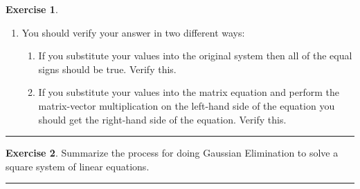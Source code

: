 \documentclass[
]{book}
\providecommand{\tightlist}{%
  \setlength{\itemsep}{0pt}\setlength{\parskip}{0pt}}
\theoremstyle{definition}
\theoremstyle{definition}
\theoremstyle{definition}
\newtheorem{exercise}{Exercise}[chapter]
\theoremstyle{remark}
\begin{document}
\begin{exercise}
\begin{enumerate}
  \begin{enumerate}
  \def\labelenumii{\roman{enumii}.}
  \tightlist
  \item
    Make the value in row 2 column 2 a 1 by scaling row 2. What did you scale by? Why?
  \item
    Scale row 2 by something and add it to row 1 so that the entry in row 1 column 2 becomes a 0. What did you scale by? Why?
  \item
    Scale row 2 by something and add it to row 0 so that the entry in row 0 column 2 becomes a 0. What did you scale by? Why?
  \item
    By the time you've made it this far you should have the system
    \[ \left( \begin{array}{ccc|c} 1 & 0 & 0 & -2 \\ 0 & 1 & 0 & 2 \\ 0 & 0 & 1 & -\frac{1}{3} \end{array} \right) \]
    and you should be able to read off the solution to the system.
  \end{enumerate}
\item
  You should verify your answer in two different ways:

  \begin{enumerate}
  \def\labelenumii{\roman{enumii}.}
  \tightlist
  \item
    If you substitute your values into the original system then all of the equal signs should be true. Verify this.
  \item
    If you substitute your values into the matrix equation and perform the matrix-vector multiplication on the left-hand side of the equation you should get the right-hand side of the equation. Verify this.
  \end{enumerate}
\end{enumerate}
\end{exercise}

\begin{center}\rule{0.5\linewidth}{0.5pt}\end{center}

\begin{exercise}
\protect\hypertarget{exr:unnamed-chunk-313}{}{\label{exr:unnamed-chunk-313} }Summarize the process for doing Gaussian Elimination to solve a square system of linear equations.
\end{exercise}

\begin{center}\rule{0.5\linewidth}{0.5pt}\end{center}
\end{document}
